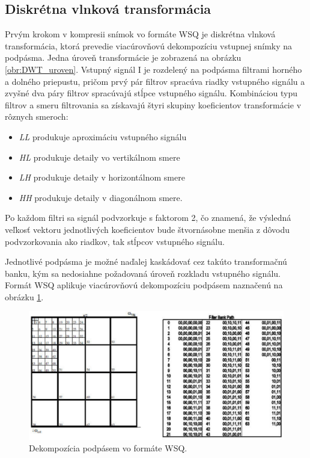   \subsection{Diskrétna vlnková transformácia}
  Prvým krokom v kompresii snímok vo formáte WSQ je diskrétna vlnková transformácia, ktorá prevedie viacúrovňovú dekompozíciu vstupnej snímky na 
  podpásma. Jedna úroveň transformácie je zobrazená na obrázku \ref{obr:DWT_uroven}. Vstupný signál I je rozdelený na podpásma filtrami horného
  a dolného priepustu, pričom prvý pár filtrov spracúva riadky vstupného signálu a zvyšné dva páry filtrov spracúvajú stĺpce vstupného signálu.
  Kombináciou typu filtrov a smeru filtrovania sa získavajú štyri skupiny koeficientov transformácie v rôznych smeroch: 
  \begin{itemize}
    \item \emph{LL} produkuje aproximáciu vstupného signálu
    \item \emph{HL} produkuje detaily vo vertikálnom smere
    \item \emph{LH} produkuje detaily v horizontálnom smere
    \item \emph{HH} produkuje detaily v diagonálnom smere.
  \end{itemize}
  Po každom filtri sa signál podvzorkuje s faktorom 2, čo znamená, že výsledná veľkosť vektoru jednotlivých koeficientov bude štvornásobne menšia
  z dôvodu podvzorkovania ako riadkov, tak stĺpcov vstupného signálu.

  Jednotlivé podpásma je možné naďalej kaskádovať cez takúto transformačnú banku, kým sa nedosiahne požadovaná úroveň rozkladu vstupného signálu.
  Formát WSQ aplikuje viacúrovňovú dekompozíciu podpásem naznačenú na obrázku \ref{obr:WSQ_DWT_dekompozicia}.
  \begin{figure}[]
    \centering
    \includegraphics[width=12cm]{obrazky-figures/WSQ_DWT_subband_decomposition.png}
    \caption{Dekompozícia podpásem vo formáte WSQ.}
    \label{obr:WSQ_DWT_dekompozicia}
  \end{figure}

